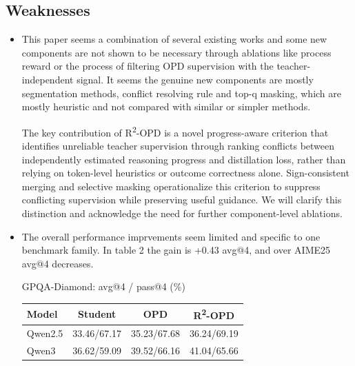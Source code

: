 \documentclass[11pt,a4paper]{article}
\begin{document}
\subsection*{Weaknesses}
\begin{itemize}
\item This paper seems a combination of several existing works and some new components are not shown to be necessary through ablations like process reward or the process of filtering OPD supervision with the teacher-independent signal. It seems the genuine new components are mostly segmentation methods, conflict resolving rule and top-q masking, which are mostly heuristic and not compared with similar or simpler methods.
\par{}
\begin{responsebox}[frametitle={Response to W1}]
The key contribution of R\textsuperscript{2}-OPD is a novel progress-aware criterion that identifies unreliable teacher supervision through ranking conflicts between independently estimated reasoning progress and distillation loss, rather than relying on token-level heuristics or outcome correctness alone. Sign-consistent merging and selective masking operationalize this criterion to suppress conflicting supervision while preserving useful guidance. We will clarify this distinction and acknowledge the need for further component-level ablations.
\end{responsebox}

\item The overall performance imprvements seem limited and specific to one benchmark family. In table 2 the gain is +0.43 avg@4, and over AIME25 avg@4 decreases.
\par{}
\begin{responsebox}[frametitle={Response to W2}]
GPQA-Diamond: avg@4 / pass@4 (\%)

\begin{center}
\begin{tabular}{lccc}
\hline
Model & Student & OPD & R\textsuperscript{2}-OPD \\
\hline
Qwen2.5 & 33.46/67.17 & 35.23/67.68 & 36.24/69.19 \\
Qwen3 & 36.62/59.09 & 39.52/66.16 & 41.04/65.66 \\
\hline
\end{tabular}
\end{center}
\end{responsebox}


\end{itemize}
\end{document}
